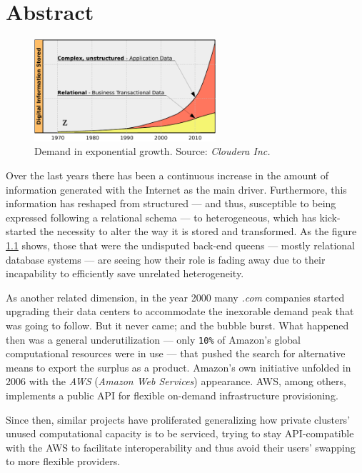 \chapter{Abstract}\label{cap:intro}


\begin{figure}[tbp]
\begin{center}
\includegraphics[width=0.6\textwidth]{imagenes/001.pdf}
 \caption{Demand in exponential growth. Source: \emph{Cloudera Inc.}}
\label{fig:datagraph}
\end{center}
\end{figure}


\noindent Over the last years there has been a continuous increase in the amount of information generated with the Internet as the main driver. Furthermore, this information has reshaped from structured --- and thus, susceptible to being expressed following a relational schema --- to heterogeneous, which has kick-started the necessity to alter the way it is stored and transformed. As the figure \ref{fig:datagraph} shows, those that were the undisputed back-end queens --- mostly relational database systems --- are seeing how their role is fading away due to their incapability to efficiently save unrelated heterogeneity.

As another related dimension, in the year 2000 many \emph{.com} companies started upgrading their data centers to accommodate the inexorable demand peak that was going to follow. But it never came; and the bubble burst. What happened then was a general underutilization --- only \texttt{10\%} of Amazon's global computational resources were in use --- that pushed the search for alternative means to export the surplus as a product. Amazon's own initiative unfolded in 2006 with the \emph{AWS} (\emph{Amazon Web Services}) appearance. AWS, among others, implements a public API for flexible on-demand infrastructure provisioning.

Since then, similar projects have proliferated generalizing how private clusters' unused computational capacity is to be serviced, trying to stay API-compatible with the AWS to facilitate interoperability and thus avoid their users' swapping to more flexible providers.


